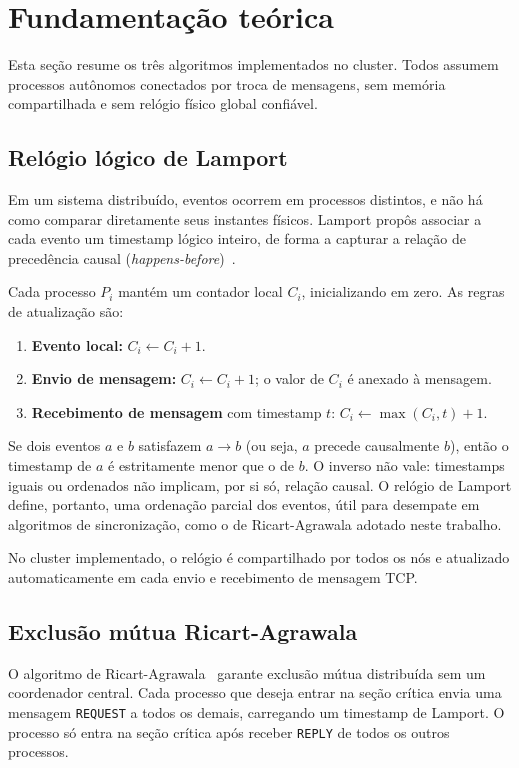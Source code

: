 \documentclass[10pt, a4paper, titlepage]{extarticle}
\begin{document}
\section{Fundamentação teórica}
\label{sec:fundamentacao}
Esta seção resume os três algoritmos implementados no cluster. Todos assumem processos autônomos conectados por troca de mensagens, sem memória compartilhada e sem relógio físico global confiável.

\subsection{Relógio lógico de Lamport}
\label{sec:lamport}
Em um sistema distribuído, eventos ocorrem em processos distintos, e não há como comparar diretamente seus instantes físicos. Lamport propôs associar a cada evento um timestamp lógico inteiro, de forma a capturar a relação de precedência causal (\emph{happens-before})~\cite{lamport1978}.

Cada processo $P_i$ mantém um contador local $C_i$, inicializando em zero. As regras de atualização são:

\begin{enumerate}
    \item \textbf{Evento local:} $C_i \leftarrow C_i + 1$.
    \item \textbf{Envio de mensagem:} $C_i \leftarrow C_i + 1$; o valor de $C_i$ é anexado à mensagem.
    \item \textbf{Recebimento de mensagem} com timestamp $t$: $C_i \leftarrow \max(C_i, t) + 1$.
\end{enumerate}

Se dois eventos $a$ e $b$ satisfazem $a \rightarrow b$ (ou seja, $a$ precede causalmente $b$), então o timestamp de $a$ é estritamente menor que o de $b$. O inverso não vale: timestamps iguais ou ordenados não implicam, por si só, relação causal. O relógio de Lamport define, portanto, uma ordenação parcial dos eventos, útil para desempate em algoritmos de sincronização, como o de Ricart-Agrawala adotado neste trabalho.

No cluster implementado, o relógio é compartilhado por todos os nós e atualizado automaticamente em cada envio e recebimento de mensagem TCP.

\subsection{Exclusão mútua Ricart-Agrawala}
\label{sec:ricart}
O algoritmo de Ricart-Agrawala~\cite{ricart1981} garante exclusão mútua distribuída sem um coordenador central. Cada processo que deseja entrar na seção crítica envia uma mensagem \texttt{REQUEST} a todos os demais, carregando um timestamp de Lamport. O processo só entra na seção crítica após receber \texttt{REPLY} de todos os outros processos.
\end{document}
